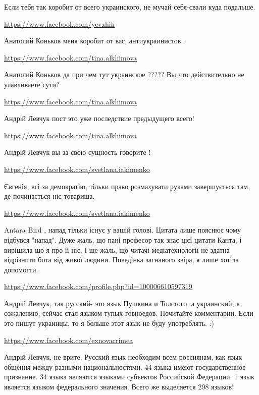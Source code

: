 \documentclass[a4paper,11pt]{extreport}
\begin{document}
\begin{itemize}
Если тебя так коробит от всего украинского, не мучай себя-свали куда подальше.

\begin{itemize}
\url{https://www.facebook.com/yevzhik}

Анатолий Коньков меня коробит от вас, антиукраинистов.

\url{https://www.facebook.com/tina.alkhimova}

Анатолий Коньков да при чем тут украинское ????? Вы что действительно не улавливаете сути?

\url{https://www.facebook.com/tina.alkhimova}

Андрій Левчук пост это уже последствие предыдущего всего!

\url{https://www.facebook.com/tina.alkhimova}

Андрій Левчук вы за свою сущность говорите !

\end{itemize}
\url{https://www.facebook.com/svetlana.iakimenko}

Євгенія, всі за демократію, тільки право розмахувати руками завершується там, де починається ніс товариша.

\begin{itemize}
\url{https://www.facebook.com/svetlana.iakimenko}

Antara Bird , напад тільки існує у вашій голові. Цитата лише пояснює чому відбувся "напад". Дуже жаль, що пані професор так знає цієї цитати Канта, і вирішила що я про її ніс. І ще жаль, що читачі медіатехнології не здатна відрізнити бота від живої людини. Поведінка загнаного звіра, я лише хотіла допомогти.

\url{https://www.facebook.com/profile.php?id=100006610597319}

Андрій Левчук, так русский- это язык Пушкина и Толстого, а украинский, к сожалению, сейчас стал языком тупых говноедов. Почитайте комментарии. Если это пишут украинцы, то я больше этот язык не буду употреблять. :)

\url{https://www.facebook.com/exnovacrimea}

Андрій Левчук, не врите. Русский язык необходим всем россиянам, как язык общения между разными национальностями. 44 языка имеют государственное признание. 34 языка являются языками субъектов Российской Федерации. 1 язык является языком федерального значения. Всего же выделяется 298 языков!


\end{itemize}
\end{itemize}
\end{document}
